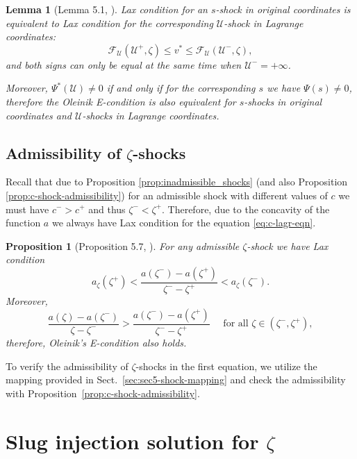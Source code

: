 \documentclass[12pt]{article}
\newtheorem{lemma}{Lemma}
\newtheorem{proposition}{Proposition}
\theoremstyle{definition}
\begin{document}
\begin{lemma}[Lemma 5.1, \cite{MR2024}]
\label{lemma_Oleinik_equivalence}
Lax condition for an $s$-shock in original coordinates is equivalent to Lax condition for the corresponding $\mathcal U$-shock in Lagrange coordinates:
\begin{equation}\label{eq:Lax-Lagrange}
\mathcal F_{\mathcal U}(\mathcal U^+, \zeta) \leqslant v^* \leqslant \mathcal F_{\mathcal U}(\mathcal U^-, \zeta),
\end{equation}
and both signs can only be equal at the same time when $\mathcal U^- = +\infty$.

Moreover, $\Psi^*(\mathcal U) \neq 0$ if and only if for the corresponding $s$ we have $\Psi(s) \neq 0$, therefore the Oleinik E-condition is also equivalent for $s$-shocks in original coordinates and $\mathcal U$-shocks in Lagrange coordinates.
\end{lemma}



\subsection{Admissibility of $\zeta$-shocks}

Recall that due to Proposition \ref{prop:inadmissible_shocks} (and also Proposition \ref{prop:c-shock-admissibility}) for an admissible shock with different values of $c$ we must have $c^- > c^+$ and thus $\zeta^- < \zeta^+$. Therefore, due to the concavity of the function $a$ we always have Lax condition for the equation \eqref{eq:c-lagr-eqn}.
\begin{proposition}[Proposition 5.7, \cite{MR2024}]
For any admissible $\zeta$-shock we have Lax condition
\[
a_\zeta(\zeta^+) < \dfrac{a(\zeta^-)-a(\zeta^+)}{\zeta^--\zeta^+} < a_\zeta(\zeta^-).
\]
Moreover, 
\[
\dfrac{a(\zeta)-a(\zeta^-)}{\zeta-\zeta^-} > \dfrac{a(\zeta^-)-a(\zeta^+)}{\zeta^--\zeta^+} \quad \text{ for all } \zeta\in(\zeta^-, \zeta^+),
\]
therefore, Oleinik's E-condition also holds.
\end{proposition}

To verify the admissibility of $\zeta$-shocks in the first equation, we utilize the mapping provided in Sect.~\ref{sec:sec5-shock-mapping} and check the admissibility with Proposition~\ref{prop:c-shock-admissibility}.



\section{Slug injection solution for $\zeta$}
\label{sec:c-sol}
\end{document}
